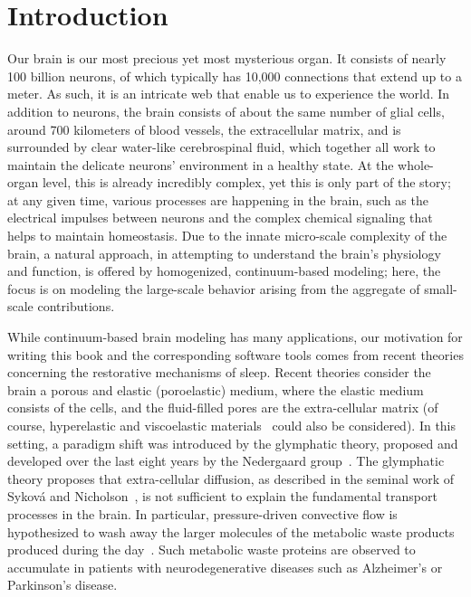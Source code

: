 \chapter{Introduction}
\label{chp:chp1}

Our brain is our most precious yet most mysterious organ. It consists
of nearly 100 billion neurons, of which typically has 10,000
connections that extend up to a meter. As such, it is an intricate web
that enable us to experience the world. In addition to neurons, the
brain consists of about the same number of glial cells, around 700
kilometers of blood vessels, the extracellular matrix, and is
surrounded by clear water-like cerebrospinal fluid, which together all
work to maintain the delicate neurons' environment in a healthy
state. At the whole-organ level, this is already incredibly complex,
yet this is only part of the story; at any given time, various
processes are happening in the brain, such as the electrical impulses
between neurons and the complex chemical signaling that helps to
maintain homeostasis. Due to the innate micro-scale complexity of the
brain, a natural approach, in attempting to understand the brain's
physiology and function, is offered by homogenized, continuum-based
modeling; here, the focus is on modeling the large-scale behavior
arising from the aggregate of small-scale contributions.

While continuum-based brain modeling has many applications, our
motivation for writing this book and the corresponding software tools
comes from recent theories concerning the restorative mechanisms of
sleep. Recent theories consider the brain a porous and elastic
(poroelastic) medium, where the elastic medium consists of the cells,
and the fluid-filled pores are the extra-cellular matrix (of course,
hyperelastic and viscoelastic materials~\cite{goriely2015mechanics,
  budday2019fifty} could also be considered). In this setting, a
paradigm shift was introduced by the glymphatic theory, proposed and
developed over the last eight years by the Nedergaard
group~\cite{iliff2012paravascular}. The glymphatic theory proposes
that extra-cellular diffusion, as described in the seminal work of
Sykov{\'a} and Nicholson~\cite{sykova2008diffusion}, is not sufficient
to explain the fundamental transport processes in the brain. In
particular, pressure-driven convective flow is hypothesized to wash
away the larger molecules of the metabolic waste products produced
during the day~\cite{iliff2012paravascular, jessen2015glymphatic,
  xie2013sleep}. Such metabolic waste proteins are observed to
accumulate in patients with neurodegenerative diseases such as
Alzheimer's or Parkinson's disease.

